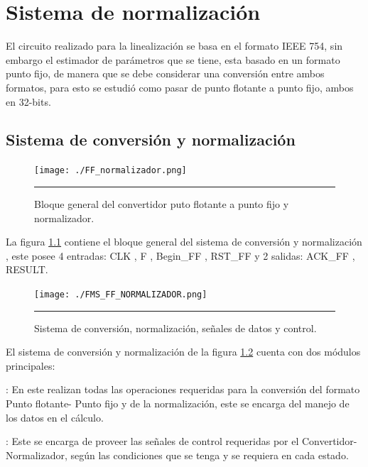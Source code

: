 \chapter{Sistema de normalización}
\label{ch:Normalizacion}

El circuito realizado para la linealización se basa en el formato IEEE 754, sin embargo el estimador de parámetros que se tiene, esta basado en un formato punto fijo, de manera que se debe considerar una conversión entre ambos formatos, para esto se estudió como pasar de punto flotante a punto fijo, ambos en 32-bits.


\section{Sistema de conversión y normalización }

\begin{figure}[H]
  \centering
    \texttt{[image: ./FF\_normalizador.png]}
    \rule{35em}{0.5pt}
  \caption[Bloque general del convertidor puto flotante a punto fijo y normalizador]{Bloque general del convertidor puto flotante a punto fijo y normalizador. }
  \label{fig:FF-NORM}
\end{figure}


La figura \ref{fig:FF-NORM} contiene el bloque general del sistema de conversión y normalización , este posee 4 entradas: CLK , F , Begin\_FF , RST\_FF y 2 salidas: ACK\_FF , RESULT.

\begin{figure}[H]
  \centering
    \texttt{[image: ./FMS\_FF\_NORMALIZADOR.png]}
    \rule{35em}{0.5pt}
  \caption[Sistema de convesión, normalización, señales de datos y control]{Sistema de conversión, normalización, señales de datos y control.}
  \label{fig:FMS_FF_NORM}
\end{figure}

El sistema de conversión y normalización de la figura \ref{fig:FMS_FF_NORM} cuenta con dos módulos principales: 

\begin{compactitem}

\item {}: En este realizan todas las operaciones requeridas para la conversión del formato Punto flotante- Punto fijo y de la normalización, este se encarga del manejo de los datos en el cálculo. 


\item {}: Este se encarga de proveer las señales de control requeridas por el Convertidor-Normalizador, según las condiciones que se tenga y se requiera en cada estado.

\end{compactitem}

